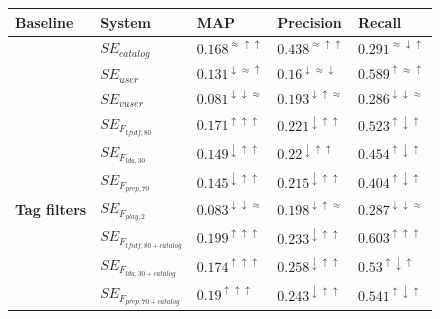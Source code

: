 \begin{table}[tb]
\centering
\begin{footnotesize}
\begin{tabular}{l|l|l|l|l}
\toprule
\multirow{5}{*}{\textbf{Baseline}} & \textbf{System} & \textbf{MAP} & \textbf{Precision}& \textbf{Recall}\\
	\hline
&$SE_{catalog}$ & $0.168^{\approx\uparrow \uparrow}$ & $0.438^{\approx\uparrow \uparrow}$ &	$0.291^{\approx\downarrow \uparrow}$ \\
\cline{2-5}
&$SE_{user}$ & $0.131^{\downarrow\approx \uparrow}$ & $0.16^{\downarrow \approx \downarrow}$ & $0.589^{\uparrow\approx \uparrow}$ \\
\cline{2-5}
&$SE_{vuser}$ & $0.081^{\downarrow \downarrow \approx}$ & $0.193^{\downarrow \uparrow \approx}$ & $0.286^{\downarrow\downarrow \approx}$ \\
\hline
\multirow{8}{*}{\textbf{Tag filters}} &$SE_{F_{tfidf,80}}$ & $0.171^{\uparrow\uparrow\uparrow}$ & $0.221^{\downarrow\uparrow\uparrow}$ & $0.523^{\uparrow\downarrow\uparrow}$ \\
\cline{2-5}
& $SE_{F_{lda,30}}$ & $0.149^{\downarrow\uparrow\uparrow}$ & $0.22^{\downarrow\uparrow\uparrow}$ & $0.454^{\uparrow\downarrow\uparrow}$ \\
\cline{2-5}
&$SE_{F_{prep,70}}$ & $0.145^{\downarrow\uparrow\uparrow}$& $0.215^{\downarrow\uparrow\uparrow}$& $0.404^{\uparrow\downarrow\uparrow}$\\
\cline{2-5}
&$SE_{F_{play,2}}$ & $0.083^{\downarrow\downarrow\approx}$ & $0.198^{\downarrow\uparrow\approx}$ & $0.287^{\downarrow\downarrow\approx}$ \\
\cline{2-5}
&$SE_{F_{tfidf,80 + catalog}}$ & $0.199^{\uparrow\uparrow\uparrow}$ & $0.233^{\downarrow\uparrow\uparrow}$ & $0.603^{\uparrow\uparrow\uparrow}$ \\
\cline{2-5}
&$SE_{F_{lda,30 + catalog}}$ & $0.174^{\uparrow\uparrow\uparrow}$ & $0.258^{\downarrow\uparrow\uparrow}$ & $0.53^{\uparrow\downarrow\uparrow}$ \\
\cline{2-5}
&$SE_{F_{prep,70 + catalog}}$ & $0.19^{\uparrow\uparrow\uparrow}$ & $0.243^{\downarrow\uparrow\uparrow}$ & $0.541^{\uparrow\downarrow\uparrow}$ \\

\end{tabular}
\end{footnotesize}
\end{table}
